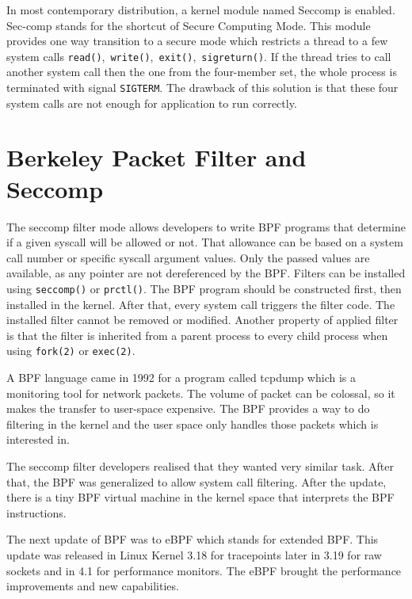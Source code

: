 In most contemporary distribution, a kernel module named Seccomp \cite{seccomp_sandbox} is enabled.
Sec-comp stands for the shortcut of Secure Computing Mode.
This module provides one way transition to a secure mode which restricts a thread to a few system calls \texttt{read()},\ \texttt{write()},\ \texttt{exit()},\ \texttt{sigreturn()}.
If the thread tries to call another system call then the one from the four-member set, the whole process is terminated with signal \texttt{SIGTERM}.
The drawback of this solution is that these four system calls are not enough for application to run correctly.


\section{Berkeley Packet Filter and Seccomp}
The seccomp filter mode allows developers to write BPF programs that determine if a given syscall will be allowed or not.
That allowance can be based on a system call number or specific syscall argument values.
Only the passed values are available, as any pointer are not dereferenced by the BPF.
Filters can be installed using \texttt{seccomp()} or \texttt{prctl()}.
The BPF program should be constructed first, then installed in the kernel.
After that, every system call triggers the filter code.
The installed filter cannot be removed or modified.
Another property of applied filter is that the filter is inherited from a parent process to every child process when using \texttt{fork(2)} or \texttt{exec(2)}.

A BPF language came in 1992 for a program called tcpdump which is a monitoring tool for network packets.
The volume of packet can be colossal, so it makes the transfer to user-space expensive.
The BPF provides a way to do filtering in the kernel and the user space only handles those packets which is interested in.

The seccomp filter developers realised that they wanted very similar task.
After that, the BPF was generalized to allow system call filtering.
After the update, there is a tiny BPF virtual machine in the kernel space that interprets the BPF instructions.

The next update of BPF was to eBPF which stands for extended BPF.
This update was released in Linux Kernel 3.18 for tracepoints later in 3.19 for raw sockets and in 4.1 for performance monitors.
The eBPF brought the performance improvements and new capabilities.

